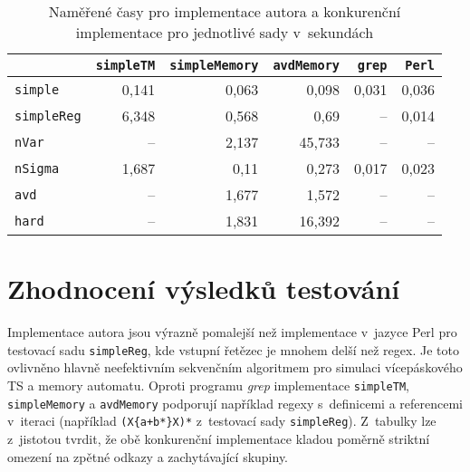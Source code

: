 \documentclass[thesis=B,czech]{FITthesis}[2019/12/23]
\theoremstyle{definition}
\begin{document}
\begin{table}
\begin{center}
\begin{tabular}{l||r|r|r|r|r}
 & 		\texttt{simpleTM}		 & \texttt{simpleMemory}   & 	\texttt{avdMemory}			&   	\texttt{grep}		      & \texttt{Perl} \\ \hline \hline
 \texttt{simple} &               0,141      & 0,063  &   0,098                 &       0,031              &  0,036  \\ \hline
 \texttt{simpleReg} &           6,348      &  0,568 &  0,69                  &   --\footnote[1]              & 0,014  \\ \hline
 \texttt{nVar} &             --\footnote[7]          &   2,137    &      45,733          &                --\footnotemark[1]      &  --\footnotemark[1]\\ \hline
 \texttt{nSigma}&            1,687           & 0,11     &        0,273       &             0,017         &   0,023\\ \hline
 \texttt{avd}& --\footnotemark[7] & 1,677 & 1,572 & --\footnotemark[1] & --\footnotemark[1] \\ \hline
\texttt{hard}&             --\footnotemark[7]      & 1,831 &          16,392         &                --\footnotemark[1]     &  --\footnotemark[1] \\ \hline
\end{tabular}
\end{center}
\caption{\label{tab:time} Naměřené časy pro implementace autora a konkurenční implementace pro jednotlivé sady v~sekundách}
\end{table}

\section{Zhodnocení výsledků testování}
Implementace autora jsou výrazně pomalejší než implementace v~jazyce Perl pro testovací sadu \texttt{simpleReg}, kde vstupní řetězec je mnohem delší než regex. Je toto ovlivněno hlavně neefektivním sekvenčním algoritmem pro simulaci vícepáskového TS a memory automatu. Oproti programu \emph{grep} implementace \texttt{simpleTM}, \texttt{simpleMemory} a \texttt{avdMemory} podporují například regexy s~definicemi a referencemi v~iteraci (například \texttt{(X\{a+b*\}X)*} z~testovací sady \texttt{simpleReg}). Z~tabulky lze z~jistotou tvrdit, že obě konkurenční implementace kladou poměrně striktní omezení na zpětné odkazy a zachytávající skupiny.
\end{document}
